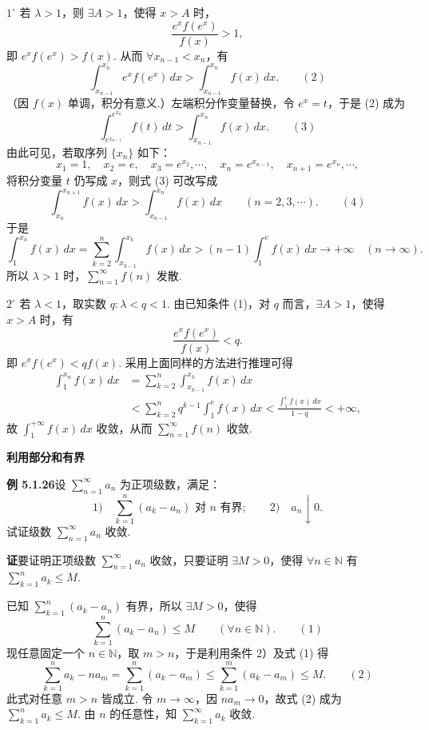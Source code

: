 \documentclass[UTF8,12pt,a4paper,fontset=fandol]{ctexart}
\begin{document}
$1^\circ$ 若 $\lambda>1$，则 $\exists A>1$，使得 $x>A$ 时，
\[
  \frac{e^xf(e^x)}{f(x)}>1,
\]
即 $e^xf(e^x)>f(x)$. 从而 $\forall x_{n-1}<x_n$，有
\[
  \int_{x_{n-1}}^{x_n} e^xf(e^x)\,dx>\int_{x_{n-1}}^{x_n}f(x)\,dx.
\qquad(2)
\]
（因 $f(x)$ 单调，积分有意义.）左端积分作变量替换，令 $e^x=t$，于是 (2) 成为
\[
  \int_{e^{x_{n-1}}}^{e^{x_n}}f(t)\,dt>\int_{x_{n-1}}^{x_n}f(x)\,dx.
\qquad(3)
\]
由此可见，若取序列 $\{x_n\}$ 如下：
\[
  x_1=1,\quad x_2=e,\quad x_3=e^{x_2},\cdots,\quad
  x_n=e^{x_{n-1}},\quad x_{n+1}=e^{x_n},\cdots,
\]
将积分变量 $t$ 仍写成 $x$，则式 (3) 可改写成
\[
  \int_{x_n}^{x_{n+1}}f(x)\,dx>\int_{x_{n-1}}^{x_n}f(x)\,dx
  \qquad(n=2,3,\cdots).
\qquad(4)
\]
于是
\[
  \int_1^{x_n}f(x)\,dx
  =\sum_{k=2}^n\int_{x_{k-1}}^{x_k}f(x)\,dx
  >(n-1)\int_1^e f(x)\,dx\to+\infty\quad(n\to\infty).
\]
所以 $\lambda>1$ 时，$\displaystyle\sum_{n=1}^\infty f(n)$ 发散.

$2^\circ$ 若 $\lambda<1$，取实数 $q:\lambda<q<1$. 由已知条件 (1)，对 $q$ 而言，$\exists A>1$，使得 $x>A$ 时，有
\[
  \frac{e^xf(e^x)}{f(x)}<q.
\]
即 $e^xf(e^x)<qf(x)$. 采用上面同样的方法进行推理可得
\[
\begin{aligned}
\int_1^{x_n}f(x)\,dx
&=\sum_{k=2}^n\int_{x_{k-1}}^{x_k}f(x)\,dx\\
&<\sum_{k=2}^n q^{k-1}\int_1^e f(x)\,dx
<\frac{\int_1^e f(x)\,dx}{1-q}<+\infty,
\end{aligned}
\]
故 $\displaystyle\int_1^{+\infty}f(x)\,dx$ 收敛，从而 $\displaystyle\sum_{n=1}^\infty f(n)$ 收敛.

\noindent\textbf{利用部分和有界}

\noindent\textbf{例 5.1.26}\quad 设 $\displaystyle\sum_{n=1}^\infty a_n$ 为正项级数，满足：
\[
  1)\quad \sum_{k=1}^n(a_k-a_n)\text{ 对 }n\text{ 有界};\qquad
  2)\quad a_n\downarrow0.
\]
试证级数 $\displaystyle\sum_{n=1}^\infty a_n$ 收敛.

\noindent\textbf{证}\quad 要证明正项级数 $\displaystyle\sum_{n=1}^\infty a_n$ 收敛，只要证明 $\exists M>0$，使得 $\forall n\in\mathbb{N}$ 有 $\displaystyle\sum_{k=1}^n a_k\le M$.

已知 $\displaystyle\sum_{k=1}^n(a_k-a_n)$ 有界，所以 $\exists M>0$，使得
\[
  \sum_{k=1}^n(a_k-a_n)\le M\qquad(\forall n\in\mathbb{N}).
\qquad(1)
\]
现任意固定一个 $n\in\mathbb{N}$，取 $m>n$，于是利用条件 2）及式 (1) 得
\[
  \sum_{k=1}^n a_k-na_m
  =\sum_{k=1}^n(a_k-a_m)
  \le\sum_{k=1}^m(a_k-a_m)\le M.
\qquad(2)
\]
此式对任意 $m>n$ 皆成立. 令 $m\to\infty$，因 $na_m\to0$，故式 (2) 成为 $\displaystyle\sum_{k=1}^n a_k\le M$. 由 $n$ 的任意性，知 $\displaystyle\sum_{k=1}^\infty a_k$ 收敛.
\end{document}
